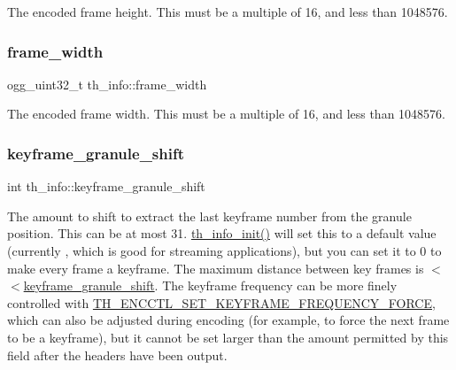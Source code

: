 The encoded frame height. This must be a multiple of 16, and less than 1048576. \mbox{\label{structth__info_a6b8087a4d831da53011a43b8d74087a0}} 
\subsubsection{\texorpdfstring{frame\+\_\+width}{frame\_width}}
{\footnotesize\ttfamily ogg\+\_\+uint32\+\_\+t th\+\_\+info\+::frame\+\_\+width}

The encoded frame width. This must be a multiple of 16, and less than 1048576. \mbox{\label{structth__info_a693ca4ab11fbc0c3f32594b4bb8766ed}} 
\subsubsection{\texorpdfstring{keyframe\+\_\+granule\+\_\+shift}{keyframe\_granule\_shift}}
{\footnotesize\ttfamily int th\+\_\+info\+::keyframe\+\_\+granule\+\_\+shift}

The amount to shift to extract the last keyframe number from the granule position. This can be at most 31. \hyperlink{group__basefuncs_ga430d9c605816a6ca0bdce3a0b965b926}{th\+\_\+info\+\_\+init()} will set this to a default value (currently {}, which is good for streaming applications), but you can set it to 0 to make every frame a keyframe. The maximum distance between key frames is {$<$$<$\hyperlink{structth__info_a693ca4ab11fbc0c3f32594b4bb8766ed}{keyframe\+\_\+granule\+\_\+shift}}. The keyframe frequency can be more finely controlled with \hyperlink{group__oldfuncs_ga27e755e15b4b5604c54974b304037a49}{T\+H\+\_\+\+E\+N\+C\+C\+T\+L\+\_\+\+S\+E\+T\+\_\+\+K\+E\+Y\+F\+R\+A\+M\+E\+\_\+\+F\+R\+E\+Q\+U\+E\+N\+C\+Y\+\_\+\+F\+O\+R\+CE}, which can also be adjusted during encoding (for example, to force the next frame to be a keyframe), but it cannot be set larger than the amount permitted by this field after the headers have been output. \mbox{\label{structth__info_a775178474283c5990ba73f9ba7f6b88b}} 

